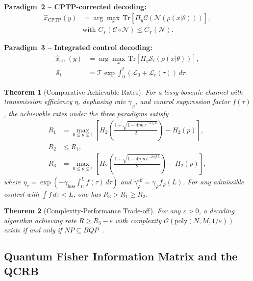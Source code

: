 \documentclass[journal,twocolumn]{IEEEtran}
\theoremstyle{definition}
\theoremstyle{plain}
\newtheorem{theorem}{Theorem}[section]
\newcommand{\Tr}{\mathrm{Tr}}
\begin{document}
\medskip\noindent\textbf{Paradigm~2 -- CPTP-corrected decoding:}
\begin{align}
  \hat x_{\mathrm{CPTP}}(y) &= \arg\max_x\,
    \Tr[\Pi_y \mathcal{C}(\mathcal{N}(\rho(x|\theta)))],
    \nonumber\\
  &\text{with } C_\chi(\mathcal{C} \circ \mathcal{N})
    \le C_\chi(\mathcal{N}).
  \label{eq:paradigm2}
\end{align}

\medskip\noindent\textbf{Paradigm~3 -- Integrated control decoding:}
\begin{align}
  \hat x_{\mathrm{ctrl}}(y) &= \arg\max_x\,
    \Tr[\Pi_y \mathcal{S}_t(\rho(x|\theta))], \nonumber\\
  \mathcal{S}_t &= \mathcal{T}\!\exp\!\int_0^t
    (\mathcal{L}_0 + \mathcal{L}_c(\tau))\,d\tau.
  \label{eq:paradigm3}
\end{align}

\begin{theorem}[Comparative Achievable Rates]
\label{thm:comparative}
For a lossy bosonic channel with transmission efficiency $\eta$,
dephasing rate $\gamma_\varphi$, and control suppression factor
$f(\tau)$, the achievable rates under the three paradigms satisfy
\begin{align}
  R_1 &= \max_{0 \le p \le 1}\!\left[
    H_2\!\left(\frac{1+\sqrt{1 - 4\eta\bar n\,
      e^{-2\gamma_\varphi L}}}{2}\right) - H_2(p)\right],
    \nonumber\\
  R_2 &\le R_1, \nonumber\\
  R_3 &= \max_{0\le p\le1}\!\left[
    H_2\!\left(\frac{1+\sqrt{1 - 4\eta_c\bar n\,
      e^{-2\gamma_\varphi^{\mathrm{eff}}L}}}{2}\right)
    - H_2(p)\right],
  \label{eq:rates}
\end{align}
where $\eta_c = \exp(-\gamma_{\mathrm{loss}}\int_0^L f(\tau)\,d\tau)$
and $\gamma_\varphi^{\mathrm{eff}} = \gamma_\varphi f_\varphi(L)$.
For any admissible control with $\int f\, d\tau < L$, one has
$R_3 > R_1 \ge R_2$.
\end{theorem}

\begin{theorem}[Complexity-Performance Trade-off]
\label{thm:complexity}
For any $\varepsilon > 0$, a decoding algorithm achieving rate
$R \ge R_3 - \varepsilon$ with complexity
$\mathcal{O}(\mathrm{poly}(N, M, 1/\varepsilon))$ exists if and
only if $NP \subseteq BQP$~\cite{aaronson2005}.
\end{theorem}

\subsection{Quantum Fisher Information Matrix and the QCRB}
\end{document}
